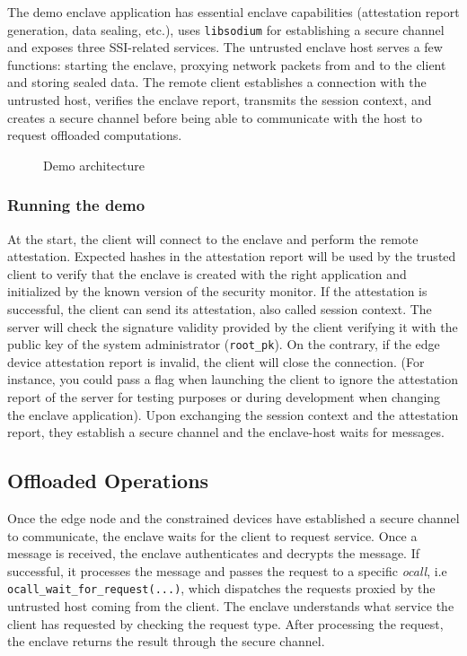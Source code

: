 The demo enclave application has essential enclave capabilities (attestation report generation, data sealing, etc.), uses \texttt{libsodium} for establishing a secure channel and exposes three SSI-related services. The untrusted enclave host serves a few functions: starting the enclave, proxying network packets from and to the client and storing sealed data. The remote client establishes a connection with the untrusted host, verifies the enclave report, transmits the session context, and creates a secure channel before being able to communicate with the host to request offloaded computations. 

\begin{figure}[!h]
    \centering
    
    \caption{Demo architecture}
    \label{poc-architecture}
\end{figure}

\subsubsection{Running the demo}

At the start, the client will connect to the enclave and perform the remote attestation. Expected hashes in the attestation report will be used by the trusted client to verify that the enclave is created with the right application and initialized by the known version of the security monitor. If the attestation is successful, the client can send its attestation, also called session context. The server will check the signature validity provided by the client verifying it with the public key of the system administrator (\texttt{root\_pk}). On the contrary, if the edge device attestation report is invalid, the client will close the connection. (For instance, you could pass a flag when launching the client to ignore the attestation report of the server for testing purposes or during development when changing the enclave application).
Upon exchanging the session context and the attestation report, they establish a secure channel and the enclave-host waits for messages.

\subsection{Offloaded Operations}
Once the edge node and the constrained devices have established a secure channel to communicate, the enclave waits for the client to request service. Once a message is received, the enclave authenticates and decrypts the message. If successful, it processes the message and passes the request to a specific \textit{ocall}, i.e \texttt{ocall\_wait\_for\_request(...)}, which dispatches the requests proxied by the untrusted host coming from the client. The enclave understands what service the client has requested by checking the request type. After processing the request, the enclave returns the result through the secure channel.


